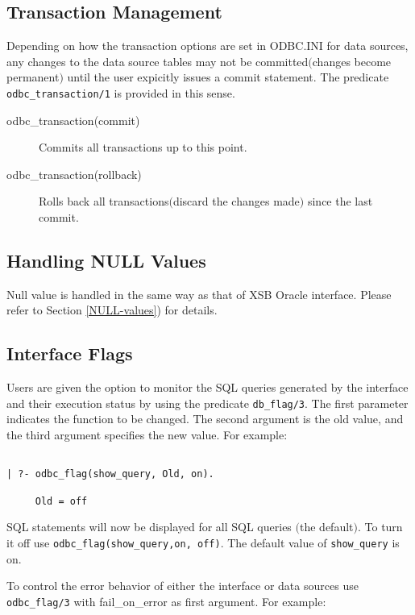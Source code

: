 \subsection{Transaction Management}\label{TransactionManagement}
Depending on how the transaction options are set in ODBC.INI for data sources, 
any changes to the data source tables may not be committed$($changes become 
permanent$)$  until the user expicitly issues a commit statement. 
The predicate {\tt odbc\_transaction/1} is provided in this sense. 
\begin{description}
\item[odbc\_transaction(commit)]
	Commits all transactions up to this point.
\item[odbc\_transaction(rollback)]
	Rolls back all transactions$($discard the changes made$)$  since 
the last commit.
\end{description}

\subsection{Handling NULL Values}
Null value is handled in the same way as that of XSB Oracle interface.
Please refer to Section \ref{NULL-values}) for details.

\subsection{Interface Flags}

Users are given the option to monitor the SQL queries generated 
by the interface and their execution status by using the 
predicate {\tt db\_flag/3}.  The first parameter indicates the function  to be
changed.  The second argument is the old value, and the third argument specifies
the new value.  For example:
\begin{verbatim}

| ?- odbc_flag(show_query, Old, on).

     Old = off
\end{verbatim}

SQL statements will now be displayed for all SQL queries $($the default$)$.
To turn it off use {\tt odbc\_flag(show\_query,on, off)}.  The default value 
of {\tt show\_query} is on.

To control the error behavior of either the interface or
data sources use {\tt odbc\_flag/3} with fail\_on\_error as first argument.
For example:

